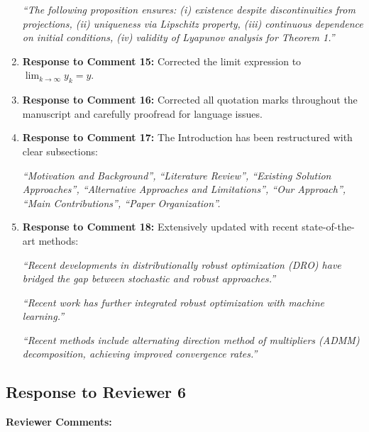 \documentclass[journal,twoside,web]{ieeecolor}
\begin{document}
\begin{enumerate}
{\color{revisionblue}\textit{``The following proposition ensures: (i) existence despite discontinuities from projections, (ii) uniqueness via Lipschitz property, (iii) continuous dependence on initial conditions, (iv) validity of Lyapunov analysis for Theorem 1.''}}

\item \textbf{Response to Comment 15:} Corrected the limit expression to $\lim_{k \to \infty} y_k=y$.

\item \textbf{Response to Comment 16:} Corrected all quotation marks throughout the manuscript and carefully proofread for language issues.

\item \textbf{Response to Comment 17:} The Introduction has been restructured with clear subsections:

{\color{revisionblue}\textit{``Motivation and Background'', ``Literature Review'', ``Existing Solution Approaches'', ``Alternative Approaches and Limitations'', ``Our Approach'', ``Main Contributions'', ``Paper Organization''.}}

\item \textbf{Response to Comment 18:} Extensively updated with recent state-of-the-art methods:

{\color{revisionblue}\textit{``Recent developments in distributionally robust optimization (DRO) have bridged the gap between stochastic and robust approaches.''}}

{\color{revisionblue}\textit{``Recent work has further integrated robust optimization with machine learning.''}}

{\color{revisionblue}\textit{``Recent methods include alternating direction method of multipliers (ADMM) decomposition, achieving improved convergence rates.''}}
\end{enumerate}
\subsection*{Response to Reviewer 6}

\noindent\textbf{Reviewer Comments:}
\end{document}
